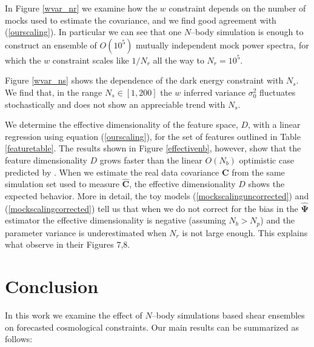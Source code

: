 \documentclass[reprint,aps,prd,superscriptaddress,showkeys,showpacs]{revtex4-1}
\newcommand{\bb}[1]{\mathbf{#1}}
\newcommand{\bbh}[1]{\mathbf{\hat{#1}}}
\begin{document}
In Figure \ref{wvar_nr} we examine how the $w$ constraint depends on the number of mocks used to estimate the covariance, and we find good agreement with (\ref{ourscaling}). In particular we can see that one $N$--body simulation is enough to construct an ensemble of $O(10^5)$ mutually independent mock power spectra, for which the $w$ constraint scales like $1/N_r$ all the way to $N_r=10^5$.    

Figure \ref{wvar_ns} shows the dependence of the dark energy constraint with $N_s$. We find that, in the range $N_s\in[1,200]$ the $w$ inferred variance $\sigma_0^2$ fluctuates stochastically and does not show an appreciable trend with $N_s$. 

We determine the effective dimensionality of the feature space, $D$, with a linear regression using equation (\ref{ourscaling}), for the set of features outlined in Table \ref{featuretable}. The results shown in Figure \ref{effectivenb}, however, show that the feature dimensionality $D$ grows faster than the linear $O(N_b)$ optimistic case predicted by \citep{DodelsonSchneider13}. When we estimate the real data covariance $\bb{C}$ from the same simulation set used to measure $\bbh{C}$, the effective dimensionality $D$ shows the expected behavior. More in detail, the toy models (\ref{mockscalinguncorrected}) and (\ref{mockscalingcorrected}) tell us that when we do not correct for the bias in the $\bbh{\Psi}$ estimator the effective dimensionality is negative (assuming $N_b>N_p$) and the parameter variance is underestimated when $N_r$ is not large enough. This explains what \citep{MinkPetri} observe in their Figures 7,8.  


\section{Conclusion}

In this work we examine the effect of $N$--body simulations based shear ensembles on forecasted cosmological constraints. Our main results can be summarized as follows:
\end{document}
